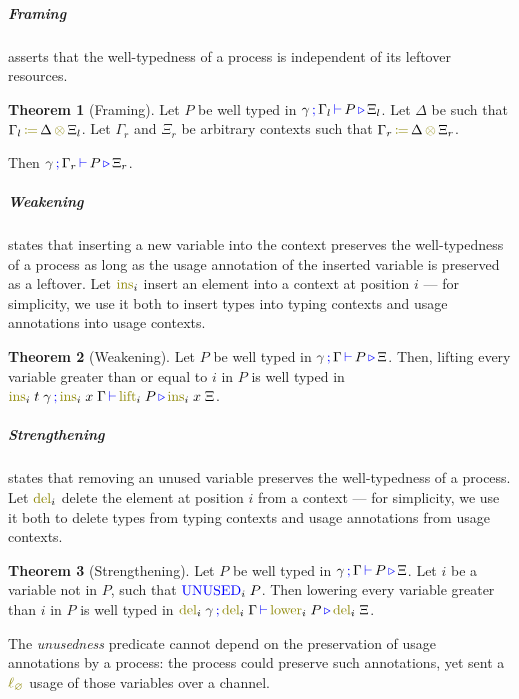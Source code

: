 \documentclass[sigplan,10pt,anonymous,review]{acmart}
\theoremstyle{definition}
\newtheorem{nitheorem}{Theorem}
\newcommand{\type}[1]{\textcolor{blue}{\operatorname{#1}}}
\newcommand{\func}[1]{\textcolor{olive}{\operatorname{#1}}}
\newcommand{\opctx}[3]{#1 \, \func{\coloneqq} \, #2 \, \func{\otimes} \, #3}
\newcommand{\lz}{\func{\ell_{\varnothing}}}
\newcommand{\types}[4]{#1 \, \type{;} \, #2 \, \type{\vdash} \, #3 \, \type{\triangleright} \, #4}
\newcommand{\Unused}{\type{UNUSED}}
\begin{document}
\subparagraph*{Framing}
asserts that the well-typedness of a process is independent of its leftover resources.

\begin{nitheorem}[Framing]
  \label{thm:framing}
  Let $P$ be well typed in $\types{\gamma}{\Gamma_l}{P}{\Xi_l}$.
  Let $\Delta$ be such that $\opctx{\Gamma_l}{\Delta}{\Xi_l}$.
  Let $\Gamma_r$ and $\Xi_r$ be arbitrary contexts such that $\opctx{\Gamma_r}{\Delta}{\Xi_r}$.

  Then $\types{\gamma}{\Gamma_r}{P}{\Xi_r}$.
\end{nitheorem}

\subparagraph*{Weakening}
states that inserting a new variable into the context preserves the well-typedness of a process as long as the usage annotation of the inserted variable is preserved as a leftover.
Let $\func{ins}_i$ insert an element into a context at position $i$ --- for simplicity, we use it both to insert types into typing contexts and usage annotations into usage contexts.
\begin{nitheorem}[Weakening]
  \label{thm:weakening}
  Let $P$ be well typed in $\types{\gamma}{\Gamma}{P}{\Xi}$.
  Then, lifting every variable greater than or equal to $i$ in $P$ is well typed in
  $\types{\func{ins}_i \; t \; \gamma}{\func{ins}_i \; x \; \Gamma}{\func{lift}_i \; P}{\func{ins}_i \; x \; \Xi}$.
\end{nitheorem}

\subparagraph*{Strengthening}
states that removing an unused variable preserves the well-typedness of a process.
Let $\func{del}_i$ delete the element at position $i$ from a context --- for simplicity, we use it both to delete types from typing contexts and usage annotations from usage contexts.
\begin{nitheorem}[Strengthening]
  \label{thm:strengthening} 
  Let $P$ be well typed in $\types{\gamma}{\Gamma}{P}{\Xi}$.
  Let $i$ be a variable not in $P$, such that $\Unused_i \; P$.
  Then lowering every variable greater than $i$ in $P$ is well typed in $\types{\func{del}_i \; \gamma}{\func{del}_i \; \Gamma}{\func{lower}_i \; P}{\func{del}_i \; \Xi}$.
\end{nitheorem}

  The \emph{unusedness} predicate cannot depend on the preservation of usage annotations by a process: the process could preserve such annotations, yet sent a $\lz$ usage of those variables over a channel.
\end{document}

